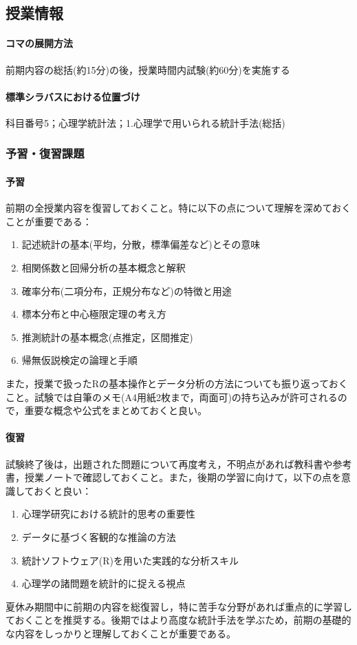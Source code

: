 \subsection{授業情報}
\paragraph{コマの展開方法}
前期内容の総括(約15分)の後，授業時間内試験(約60分)を実施する
\paragraph{標準シラバスにおける位置づけ}
科目番号5；心理学統計法；1.心理学で用いられる統計手法(総括)
\subsubsection{予習・復習課題}
\paragraph{予習}
前期の全授業内容を復習しておくこと。特に以下の点について理解を深めておくことが重要である：
\begin{enumerate}
\item 記述統計の基本(平均，分散，標準偏差など)とその意味
\item 相関係数と回帰分析の基本概念と解釈
\item 確率分布(二項分布，正規分布など)の特徴と用途
\item 標本分布と中心極限定理の考え方
\item 推測統計の基本概念(点推定，区間推定)
\item 帰無仮説検定の論理と手順
\end{enumerate}
また，授業で扱ったRの基本操作とデータ分析の方法についても振り返っておくこと。試験では自筆のメモ(A4用紙2枚まで，両面可)の持ち込みが許可されるので，重要な概念や公式をまとめておくと良い。

\paragraph{復習}
試験終了後は，出題された問題について再度考え，不明点があれば教科書や参考書，授業ノートで確認しておくこと。また，後期の学習に向けて，以下の点を意識しておくと良い：

\begin{enumerate}
\item 心理学研究における統計的思考の重要性
\item データに基づく客観的な推論の方法
\item 統計ソフトウェア(R)を用いた実践的な分析スキル
\item 心理学の諸問題を統計的に捉える視点
\end{enumerate}

夏休み期間中に前期の内容を総復習し，特に苦手な分野があれば重点的に学習しておくことを推奨する。後期ではより高度な統計手法を学ぶため，前期の基礎的な内容をしっかりと理解しておくことが重要である。